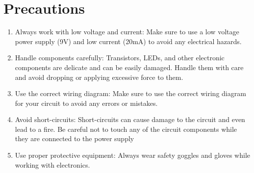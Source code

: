 \documentclass[12pt]{article}
\begin{document}
\section{Precautions}
    \begin{enumerate}
        \item Always work with low voltage and current: Make sure to use a low  voltage power supply (9V) and low current (20mA) to avoid any electrical  hazards. 
        \item Handle components carefully: Transistors, LEDs, and other electronic  components are delicate and can be easily damaged. Handle them with  care and avoid dropping or applying excessive force to them. 
        \item Use the correct wiring diagram: Make sure to use the correct wiring  diagram for your circuit to avoid any errors or mistakes.
        \item Avoid short-circuits: Short-circuits can cause damage to the circuit and  even lead to a fire. Be careful not to touch any of the circuit components  while they are connected to the power supply
        \item Use proper protective equipment: Always wear safety goggles and  gloves while working with electronics. 
    \end{enumerate}
\end{document}
